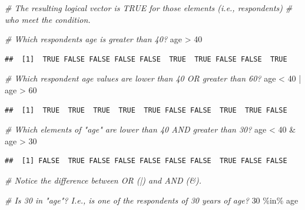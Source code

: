 \documentclass[
]{book}
\newenvironment{Shaded}{\begin{snugshade}}{\end{snugshade}}
\newcommand{\CommentTok}[1]{\textcolor[rgb]{0.56,0.35,0.01}{\textit{#1}}}
\newcommand{\DecValTok}[1]{\textcolor[rgb]{0.00,0.00,0.81}{#1}}
\newcommand{\NormalTok}[1]{#1}
\newcommand{\SpecialCharTok}[1]{\textcolor[rgb]{0.00,0.00,0.00}{#1}}
\begin{document}
\begin{Shaded}
\begin{Highlighting}[]
\CommentTok{\# The resulting logical vector is TRUE for those elements (i.e., respondents)}
\CommentTok{\# who meet the condition.}

\CommentTok{\# Which respondent\textquotesingle{}s age is greater than 40?}
\NormalTok{age }\SpecialCharTok{\textgreater{}} \DecValTok{40}
\end{Highlighting}
\end{Shaded}

\begin{verbatim}
##  [1]  TRUE FALSE FALSE FALSE FALSE  TRUE  TRUE FALSE FALSE  TRUE
\end{verbatim}

\begin{Shaded}
\begin{Highlighting}[]
\CommentTok{\# Which respondent age values are lower than 40 OR greater than 60?}
\NormalTok{age }\SpecialCharTok{\textless{}} \DecValTok{40} \SpecialCharTok{|}\NormalTok{ age }\SpecialCharTok{\textgreater{}} \DecValTok{60}
\end{Highlighting}
\end{Shaded}

\begin{verbatim}
##  [1]  TRUE  TRUE  TRUE  TRUE  TRUE FALSE FALSE  TRUE  TRUE FALSE
\end{verbatim}

\begin{Shaded}
\begin{Highlighting}[]
\CommentTok{\# Which elements of "age" are lower than 40 AND greater than 30?}
\NormalTok{age }\SpecialCharTok{\textless{}} \DecValTok{40} \SpecialCharTok{\&}\NormalTok{ age }\SpecialCharTok{\textgreater{}} \DecValTok{30}
\end{Highlighting}
\end{Shaded}

\begin{verbatim}
##  [1] FALSE  TRUE FALSE FALSE FALSE FALSE FALSE  TRUE FALSE FALSE
\end{verbatim}

\begin{Shaded}
\begin{Highlighting}[]
\CommentTok{\# Notice the difference between OR (|) and AND (\&).}

\CommentTok{\# Is 30 in "age"? I.e., is one of the respondents of 30 years of age?}
\DecValTok{30} \SpecialCharTok{\%in\%}\NormalTok{ age}
\end{Highlighting}
\end{Shaded}
\end{document}
